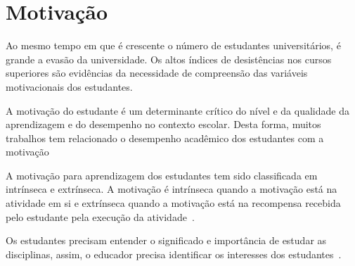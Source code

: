 \section{Motivação}
Ao mesmo tempo em que é crescente o número
de estudantes universitários, é grande a
evasão da universidade.
Os altos índices de desistências nos cursos
superiores são evidências da necessidade de
compreensão das variáveis motivacionais
dos estudantes.

A motivação do estudante é um determinante crítico 
do  nível  e  da  qualidade  da  aprendizagem
e do desempenho no contexto
escolar.
Desta forma, muitos trabalhos tem relacionado o desempenho
acadêmico dos estudantes com
a motivação~\cite{zenorini2011motivaccao,rufini2011estudo}

A motivação para aprendizagem dos estudantes
tem sido classificada em intrínseca e
extrínseca.
A motivação é intrínseca quando a motivação
está na atividade em si e extrínseca quando
a motivação está na recompensa recebida pelo estudante
pela execução da
atividade~\cite{rufini2011estudo,neves2007escala}.

Os estudantes precisam entender o significado e importância
de estudar as disciplinas, assim, o educador
precisa identificar os interesses
dos estudantes~\cite{angeli2011relaccao}.
